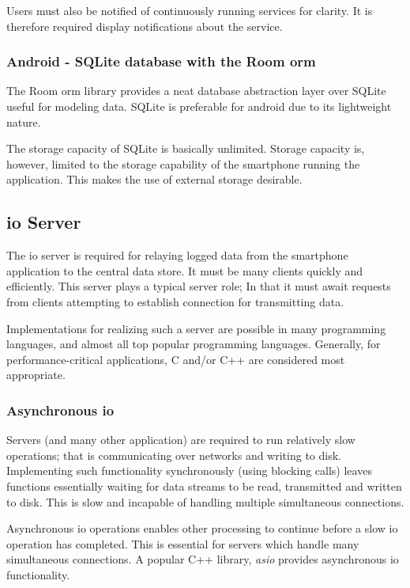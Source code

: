 Users must also be notified of continuously running services for clarity.
It is therefore required display notifications about the service.
\cite{noauthor_foreground_nodate}

\subsubsection{Android - SQLite database with the Room \ac{orm}}
The Room \ac{orm} library provides a neat database abstraction layer over SQLite useful for modeling data.
SQLite is preferable for android due to its lightweight nature.
\cite{noauthor_save_nodate}

The storage capacity of SQLite is basically unlimited.
Storage capacity is, however, limited to the storage capability of the smartphone running the application.
This makes the use of external storage desirable.

\subsection{\ac{io} Server}
The \ac{io} server is required for relaying logged data from the smartphone application to the central data store. It must be many clients quickly and efficiently.
This server plays a typical server role; In that it must await requests from clients attempting to establish connection for transmitting data.

Implementations for realizing such a server are possible in many programming languages, and almost all top popular programming languages. 
Generally, for performance-critical applications, C and/or C++ are considered most appropriate. \cite{ogala2020comparative}

\subsubsection{Asynchronous \Ac{io}}
Servers (and many other application) are required to run relatively slow operations; that is communicating over networks and writing to disk.
Implementing such functionality synchronously (using blocking calls) leaves functions essentially waiting for data streams to be read, transmitted and written to disk.
This is slow and incapable of handling multiple simultaneous connections.

Asynchronous \ac{io} operations enables other processing to continue before a slow \ac{io} operation has completed.
This is essential for servers which handle many simultaneous connections.
A popular C++ library, \textit{asio} provides asynchronous \ac{io} functionality.
\cite{anggoro2015boost}

